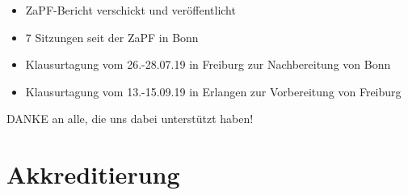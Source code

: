 \documentclass[compress, aspectratio=169]{beamer}
\begin{document}
\begin{frame}
  \begin{itemize}
    \item ZaPF-Bericht verschickt und veröffentlicht
    \item 7 Sitzungen seit der ZaPF in Bonn
    \item Klausurtagung vom 26.-28.07.19 in Freiburg zur Nachbereitung von Bonn
    \item Klausurtagung vom 13.-15.09.19 in Erlangen zur Vorbereitung von Freiburg
    \end{itemize}
    \vspace{5mm}
    \begin{center}
      \Large DANKE an alle, die uns dabei unterstützt haben!
    \end{center}
\end{frame}




\section{Akkreditierung}
\end{document}
